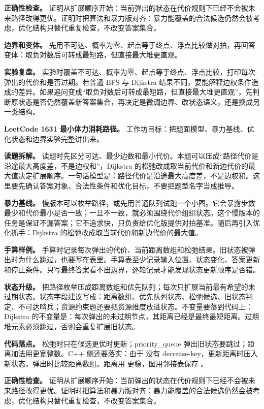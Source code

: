 \textbf{正确性检查。} 证明从扩展顺序开始：当前弹出的状态在代价规则下已经不会被未来路径改得更优。证明时把算法和暴力版对齐：暴力能覆盖的合法候选仍然会被考虑，优化结构只替代重复检查，不改变答案集合。

\textbf{边界和变体。} 先用不可达、概率为零、起点等于终点、浮点比较做对拍，再回答变体：取负对数后可转成最短路，但直接最大堆更直观。

\textbf{实验复盘。} 实验时覆盖不可达、概率为零、起点等于终点、浮点比较，打印每次弹出的代价和是否过期。若普通 BFS 与 Dijkstra 结果不同，要能解释边权条件造成的差异。如果追问变成“取负对数后可转成最短路，但直接最大堆更直观”，先判断原状态是否仍然覆盖新答案集合，再决定是微调边界、改状态语义，还是换成另一类结构。

\noindent\textbf{LeetCode 1631 最小体力消耗路径。} 工作坊目标：把题面模型、暴力基线、优化状态和边界实验完整讲出来。

\textbf{读题拆解。} 读题时先区分可达、最少边数和最小代价。本题可以压成“路径代价是沿途最大高度差，不是边权和”，Dijkstra 的松弛改成取当前代价和新边代价的最大值决定扩展顺序。一句话模型是：路径代价是沿途最大高度差，不是边权和。这里要先确认答案对象、合法性条件和优化目标，不要把题型名字当成推导。

\textbf{暴力基线。} 慢版本可以枚举路径，或先用普通队列试跑一个小图。它会暴露步数最少和代价最小是否一致；一旦不一致，就必须围绕代价组织状态。这个慢版本的任务是保证不漏答案；它不追求快，只负责给优化版提供对拍基准。随后再引入优化抓手：Dijkstra 的松弛改成取当前代价和新边代价的最大值。

\textbf{手算样例。} 手算时记录每次弹出的代价、当前距离数组和松弛结果。旧状态被弹出时为什么跳过，也要写在表里。手算表至少记录输入位置、状态变化、答案更新和停止条件。只写最终答案看不出边界，逐轮记录才能发现状态更新顺序是否错。

\textbf{状态升级。} 把路径枚举压成距离数组和优先队列；每次只扩展当前最有希望的未过期状态。状态字段建议写成：距离数组、优先队列状态、松弛候选、旧状态判定、不可达哨兵；资源约束题还要把资源维度放进状态。不变量要落到代码上：Dijkstra 的不变量是：每次弹出的未过期节点，其距离已经是最终最短距离。过期堆元素必须跳过，否则会重复扩展旧状态。

\textbf{代码落点。} 松弛时只在候选更优时更新；priority\_queue 弹出旧状态要跳过；距离加法用更宽整数。C++ 侧还要落实：由于  没有 decrease-key，更新距离时压入新状态，弹出时比较距离数组。距离用  更稳，图用邻接表保存 。

\textbf{正确性检查。} 证明从扩展顺序开始：当前弹出的状态在代价规则下已经不会被未来路径改得更优。证明时把算法和暴力版对齐：暴力能覆盖的合法候选仍然会被考虑，优化结构只替代重复检查，不改变答案集合。

